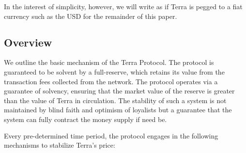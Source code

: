 \documentclass{article}
\begin{document}
In the interest of simplicity, however, we will write as if Terra is pegged to a fiat currency such as the USD for the remainder of this paper. 


\subsection{Overview}

We outline the basic mechanism of the Terra Protocol. The protocol is guaranteed to be solvent by a full-reserve, which retains its value from the transaction fees collected from the network. The protocol operates via a guarantee of solvency, ensuring that the market value of the reserve is greater than the value of Terra in circulation. The stability of such a system is not maintained by blind faith and optimism of loyalists but a guarantee that the system can fully contract the money supply if need be. 

Every pre-determined time period, the protocol engages in the following mechanisms to stabilize Terra's price: 
\end{document}
